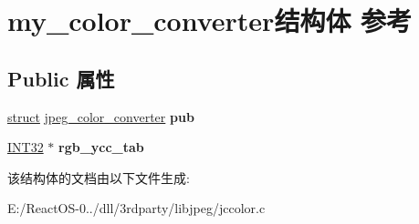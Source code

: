 \hypertarget{structmy__color__converter}{}\section{my\+\_\+color\+\_\+converter结构体 参考}
\label{structmy__color__converter}
\subsection*{Public 属性}
\begin{DoxyCompactItemize}
\item 
\mbox{\label{structmy__color__converter_a6dbeef88bd91b6e62d940ad245474768}} 
\hyperlink{interfacestruct}{struct} \hyperlink{structjpeg__color__converter}{jpeg\+\_\+color\+\_\+converter} {\bfseries pub}
\item 
\mbox{\label{structmy__color__converter_a783865e631ba6e4e903fcfad6625ec2f}} 
\hyperlink{_processor_bind_8h_a1137216524060afd426c34677fed058b}{I\+N\+T32} $\ast$ {\bfseries rgb\+\_\+ycc\+\_\+tab}
\end{DoxyCompactItemize}


该结构体的文档由以下文件生成\+:\begin{DoxyCompactItemize}
\item 
E\+:/\+React\+O\+S-\/0../dll/3rdparty/libjpeg/jccolor.\+c\end{DoxyCompactItemize}
